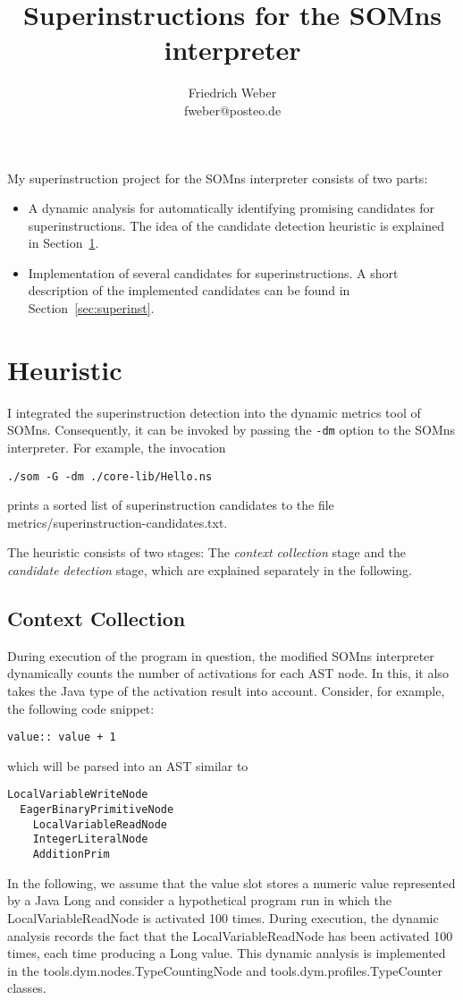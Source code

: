 \documentclass[10pt,a4paper]{article}
\author{Friedrich Weber\\
\small fweber@posteo.de}
\title{Superinstructions for the SOMns interpreter}
\begin{document}
	
\maketitle

My superinstruction project for the SOMns interpreter consists of two parts:
\begin{itemize}
	\item A dynamic analysis for automatically identifying promising candidates for superinstructions. The idea of the candidate detection heuristic is explained in Section~\ref{sec:heuristic}.
	\item Implementation of several candidates for superinstructions. A short description of the implemented candidates can be found in Section~\ref{sec:superinst}.
\end{itemize}

\section{Heuristic}\label{sec:heuristic}

I integrated the superinstruction detection into the dynamic metrics tool of SOMns. Consequently, it can be invoked by passing the \verb|-dm| option to the SOMns interpreter. For example, the invocation
\begin{verbatim}
./som -G -dm ./core-lib/Hello.ns
\end{verbatim}
prints a sorted list of superinstruction candidates to the file \textsf{metrics/superinstruction-candidates.txt}.

The heuristic consists of two stages: The \emph{context collection} stage and the \emph{candidate detection} stage, which are explained separately in the following.

\subsection{Context Collection}

During execution of the program in question, the modified SOMns interpreter dynamically counts the number of activations for each AST node. In this, it also takes the Java type of the activation result into account. Consider, for example, the following code snippet:
\begin{verbatim}
value:: value + 1
\end{verbatim}
which will be parsed into an AST similar to
\begin{verbatim}
LocalVariableWriteNode
  EagerBinaryPrimitiveNode
    LocalVariableReadNode
    IntegerLiteralNode
    AdditionPrim
\end{verbatim}
In the following, we assume that the \textsf{value} slot stores a numeric value represented by a Java \textsf{Long} and consider a hypothetical program run in which the \textsf{LocalVariableReadNode} is activated 100 times. During execution, the dynamic analysis records the fact that the \textsf{LocalVariableReadNode} has been activated 100 times, each time producing a \textsf{Long} value. This dynamic analysis is implemented in the \textsf{tools.dym.nodes.TypeCountingNode} and \textsf{tools.dym.profiles.TypeCounter} classes.
\end{document}
